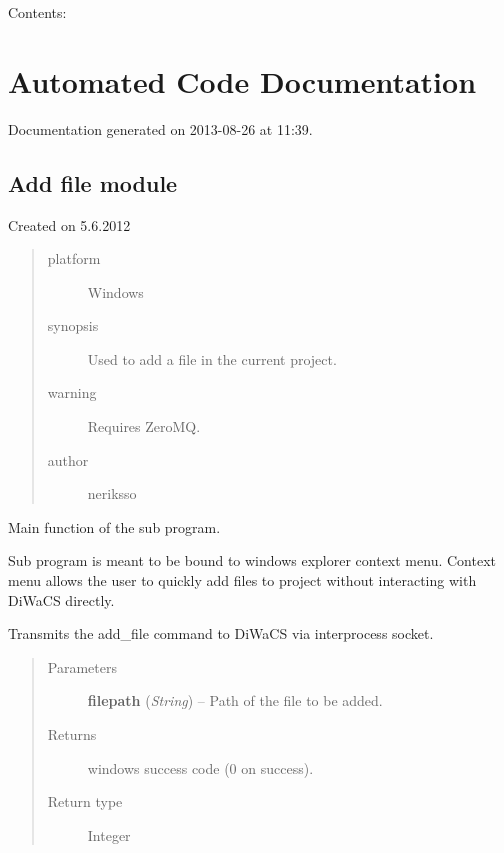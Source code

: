 \documentclass[letterpaper,10pt,english]{sphinxmanual}
\begin{document}
Contents:


\chapter{Automated Code Documentation}
\label{api:automated-code-documentation}\label{api::doc}\label{api:welcome-to-diwacs-documentation}
Documentation generated on 2013-08-26 at 11:39.


\section{Add file module}
\label{add_file:module-add_file}\label{add_file:add-file-module}\label{add_file::doc}
Created on 5.6.2012
\begin{quote}\begin{description}
\item[{platform}] \leavevmode
Windows

\item[{synopsis}] \leavevmode
Used to add a file in the current project.

\item[{warning}] \leavevmode
Requires ZeroMQ.

\item[{author}] \leavevmode
neriksso

\end{description}\end{quote}

\begin{fulllineitems}
\label{add_file:add_file.main}
Main function of the sub program.

Sub program is meant to be bound to windows explorer context menu.
Context menu allows the user to quickly add files to project without
interacting with DiWaCS directly.

Transmits the add\_file command to DiWaCS via interprocess socket.
\begin{quote}\begin{description}
\item[{Parameters}] \leavevmode
\textbf{filepath} (\emph{String}) -- Path of the file to be added.

\item[{Returns}] \leavevmode
windows success code (0 on success).

\item[{Return type}] \leavevmode
Integer

\end{description}\end{quote}

\end{fulllineitems}
\end{document}
